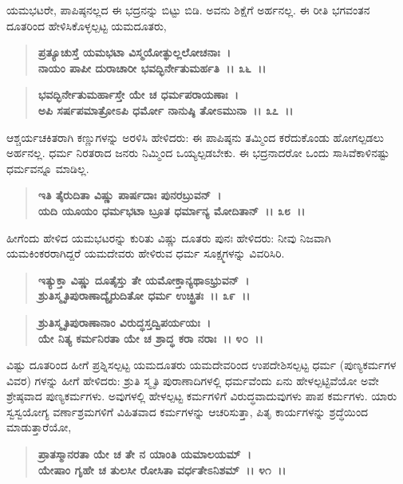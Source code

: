 ಯಮಭಟರೇ, ಪಾಪಿಷ್ಠನಲ್ಲದ ಈ ಭದ್ರನನ್ನು ಬಿಟ್ಟು ಬಿಡಿ. ಅವನು ಶಿಕ್ಷೆಗೆ ಅರ್ಹನಲ್ಲ. ಈ ರೀತಿ ಭಗವಂತನ ದೂತರಿಂದ ಹೇಳಿಸಿಕೊಳ್ಳಲ್ಪಟ್ಟ ಯಮದೂತರು,

\begin{verse}
\textbf{ಪ್ರತ್ಯೂಚುಸ್ತೆ ಯಮಭಟಾ ವಿಸ್ಮಯೋತ್ಫುಲ್ಲಲೋಚನಾಃ~।}\\\textbf{ನಾಯಂ ಪಾಪೀ ದುರಾಚಾರೀ ಭವದ್ಭಿರ್ನೇತುಮರ್ಹತಿ~।। ೩೬~।। }
\end{verse}

\begin{verse}
\textbf{ಭವದ್ಭಿರ್ನೇತುಮರ್ಹಾಸ್ತೇ ಯೇ ಚ ಧರ್ಮಪರಾಯಣಾಃ~।}\\\textbf{ಅಪಿ ಸರ್ಷಪಮಾತ್ರೋಽಪಿ ಧರ್ಮೋ ನಾನುಷ್ಠಿ ತೋಽಮುನಾ~।। ೩೭~।।}
\end{verse}

ಆಶ್ಚರ್ಯಚಕಿತರಾಗಿ ಕಣ್ಣುಗಳನ್ನು ಅರಳಿಸಿ ಹೇಳಿದರು: ಈ ಪಾಪಿಷ್ಠನು ತಮ್ಮಿಂದ ಕರೆದುಕೊಂಡು ಹೋಗಲ್ಪಡಲು ಅರ್ಹನಲ್ಲ. ಧರ್ಮ ನಿರತರಾದ ಜನರು ನಿಮ್ಮಿಂದ ಒಯ್ಯಲ್ಪಡಬೇಕು. ಈ ಭದ್ರನಾದರೋ ಒಂದು ಸಾಸಿವೆಕಾಳಿನಷ್ಟು ಧರ್ಮವನ್ನೂ ಮಾಡಿಲ್ಲ.

\begin{verse}
\textbf{ಇತಿ ತೈರುದಿತಾ ವಿಷ್ಣು ಪಾರ್ಷದಾಃ ಪುನರಬ್ರುವನ್~।}\\\textbf{ಯದಿ ಯೂಯಂ ಧರ್ಮಭಟಾ ಬ್ರೂತ ಧರ್ಮಾನ್ಯ ಮೋದಿತಾನ್~।। ೩೮~।।}
\end{verse}

ಹೀಗೆಂದು ಹೇಳಿದ ಯಮಭಟರನ್ನು ಕುರಿತು ವಿಷ್ಣು ದೂತರು ಪುನಃ ಹೇಳಿದರು: ನೀವು ನಿಜವಾಗಿ ಯಮಕಿಂಕರರಾಗಿದ್ದರೆ ಯಮದೇವರು ಹೇಳಿರುವ ಧರ್ಮ ಸೂಕ್ಷ್ಮಗಳನ್ನು ವಿವರಿಸಿರಿ.

\begin{verse}
\textbf{ಇತ್ಯುಕ್ತಾ ವಿಷ್ಣು ದೂತೈಸ್ತು ತೇ ಯಮೋಕ್ತಾನ್ಯಥಾಽಭ್ರುವನ್~।}\\\textbf{ಶ್ರುತಿಸ್ಮೃತಿಪುರಾಣಾದ್ಯೈರುದಿತೋ ಧರ್ಮ ಉಚ್ಛ್ರಿತಃ~।। ೩೯~।।} 
\end{verse}

\begin{verse}
\textbf{ಶ್ರುತಿಸ್ಮೃತಿಪುರಾಣಾನಾಂ ವಿರುದ್ಧಸ್ತದ್ವಿಪರ್ಯಯಃ~।}\\\textbf{ಯೇ ನಿತ್ಯ ಕರ್ಮನಿರತಾ ಯೇ ಚ ಶ್ರಾದ್ಧ ಕರಾ ನರಾಃ~।। ೪೦~।।}
\end{verse}

ವಿಷ್ಟು ದೂತರಿಂದ ಹೀಗೆ ಪ್ರಶ್ನಿಸಲ್ಪಟ್ಟ ಯಮದೂತರು ಯಮದೇವರಿಂದ ಉಪದೇಶಿಸಲ್ಪಟ್ಟ ಧರ್ಮ (ಪುಣ್ಯಕರ್ಮಗಳ ವಿವರ) ಗಳನ್ನು ಹೀಗೆ ಹೇಳಿದರು: ಶ್ರುತಿ ಸ್ಮೃತಿ ಪುರಾಣಾದಿಗಳಲ್ಲಿ ಧರ್ಮವೆಂದು ಏನು ಹೇಳಲ್ಪಟ್ಟಿವೆಯೋ ಅವೇ ಶ್ರೇಷ್ಠವಾದ ಪುಣ್ಯಕರ್ಮಗಳು. ಅವುಗಳಲ್ಲಿ ಹೇಳಲ್ಪಟ್ಟ ಕರ್ಮಗಳಿಗೆ ವಿರುದ್ಧವಾದುವುಗಳು ಪಾಪ ಕರ್ಮಗಳು. ಯಾರು ಸ್ವಸ್ವಯೋಗ್ಯ ವರ್ಣಾಶ್ರಮಗಳಿಗೆ ವಿಹಿತವಾದ ಕರ್ಮಗಳನ್ನು ಆಚರಿಸುತ್ತಾ, ಪಿತೃ ಕಾರ್ಯಗಳನ್ನು ಶ್ರದ್ಧೆಯಿಂದ ಮಾಡುತ್ತಾರೆಯೋ,

\begin{verse}
\textbf{ಪ್ರಾತಸ್ಮಾನರತಾ ಯೇ ಚ ತೇ ನ ಯಾಂತಿ ಯಮಾಲಯಮ್~।}\\\textbf{ಯೇಷಾಂ ಗೃಹೇ ಚ ತುಲಸೀ ರೋಸಿತಾ ವರ್ಧತೇಽನಿಶಮ್~।। ೪೧~।। }
\end{verse}

